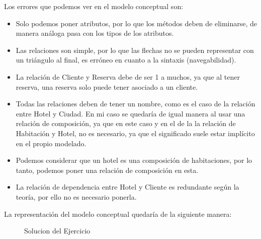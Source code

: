 Los errores que podemos ver en el modelo conceptual son:
\begin{itemize}
    \item Solo podemos poner atributos, por lo que los métodos deben de eliminarse, de manera análoga pasa con los tipos de los atributos.
    \item Las relaciones son simple, por lo que las flechas no se pueden representar con un triángulo al final, es erróneo en cuanto a la sintaxis (navegabilidad).
    \item La relación de Cliente y Reserva debe de ser 1  a muchos, ya que al tener reserva, una reserva solo puede tener asociado a un cliente.
    \item Todas las relaciones deben de tener un nombre, como es el caso de la relación entre Hotel y Ciudad.  En mi caso se quedaría de igual manera al usar una relación de composición, ya que en este caso y en el de la la relación de Habitación y Hotel, no es necesario, ya que el significado suele estar implícito en el propio modelado. 
    \item Podemos considerar que un hotel es una composición de habitaciones, por lo tanto, podemos poner una relación de composición en esta.
    \item La relación de dependencia entre Hotel y Cliente es redundante según la teoría, por ello no es necesario ponerla.
\end{itemize}
\newpage

La representación del modelo conceptual quedaría de la siguiente manera:

\begin{figure}[H]
    \centering
    \caption{Solucion del Ejercicio}
    \label{fig:sol}
\end{figure}
